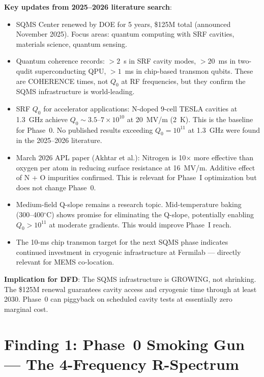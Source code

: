 \documentclass[11pt]{article}
\newcommand{\ee}[1]{\times 10^{#1}}
\theoremstyle{definition}
\theoremstyle{remark}
\begin{document}
\begin{tcolorbox}[colback=blue!5!white, colframe=blue!60!black,
  title=\textbf{W4i19 P2: DEEP REFINEMENT --- 5 KEY RESULTS}]
\begin{enumerate}
  \textbf{Key updates from 2025--2026 literature search}:
  \begin{itemize}[nosep]
  \item SQMS Center renewed by DOE for 5 years, \$125M total
    (announced November 2025). Focus areas: quantum computing with
    SRF cavities, materials science, quantum sensing.
  \item Quantum coherence records: $>2$~s in SRF cavity modes,
    $>20$~ms in two-qudit superconducting QPU, $>1$~ms in
    chip-based transmon qubits. These are COHERENCE times,
    not $Q_0$ at RF frequencies, but they confirm the SQMS
    infrastructure is world-leading.
  \item SRF $Q_0$ for accelerator applications: N-doped 9-cell
    TESLA cavities at 1.3~GHz achieve $Q_0 \sim 3.5$--$7\ee{10}$
    at 20~MV/m (2~K). This is the baseline for Phase~0.
    No published results exceeding $Q_0 = 10^{11}$ at 1.3~GHz
    were found in the 2025--2026 literature.
  \item March 2026 APL paper (Akhtar et al.): Nitrogen is
    10$\times$ more effective than oxygen per atom in reducing
    surface resistance at 16~MV/m. Additive effect of N + O
    impurities confirmed. This is relevant for Phase~I optimization
    but does not change Phase~0.
  \item Medium-field Q-slope remains a research topic. Mid-temperature
    baking (300--400$^\circ$C) shows promise for eliminating the
    Q-slope, potentially enabling $Q_0 > 10^{11}$ at moderate
    gradients. This would improve Phase~I reach.
  \item The 10-ms chip transmon target for the next SQMS phase
    indicates continued investment in cryogenic infrastructure
    at Fermilab --- directly relevant for MEMS co-location.
  \end{itemize}

  \textbf{Implication for DFD}: The SQMS infrastructure is GROWING,
  not shrinking. The \$125M renewal guarantees cavity access and
  cryogenic time through at least 2030. Phase~0 can piggyback on
  scheduled cavity tests at essentially zero marginal cost.

\end{enumerate}

\end{tcolorbox}


\part{Finding 1: Phase~0 Smoking Gun --- The 4-Frequency R-Spectrum}
\label{part:phase0}
\end{document}
